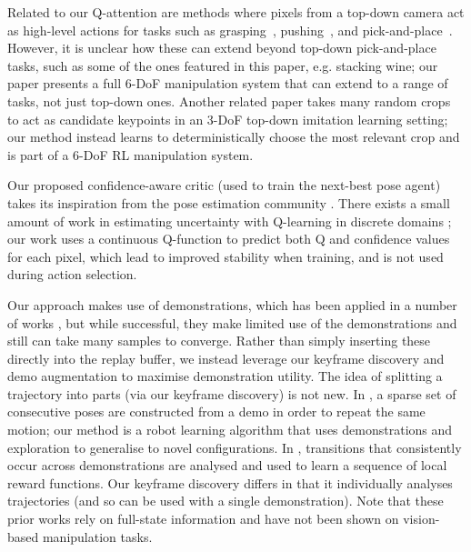 \documentclass[letterpaper, 10 pt, journal, twoside]{IEEEtran}
\begin{document}
Related to our Q-attention are methods where pixels from a top-down camera act as high-level actions for tasks such as grasping~\cite{morrison2018closing}, pushing~\cite{zeng2018learning}, and pick-and-place~\cite{zeng2020transporter}. However, it is unclear how these can extend beyond top-down pick-and-place tasks, such as some of the ones featured in this paper, e.g. stacking wine; our paper presents a full 6-DoF manipulation system that can extend to a range of tasks, not just top-down ones. Another related paper \cite{wang2021generalization} takes many random crops to act as candidate keypoints in an 3-DoF top-down imitation learning setting; our method instead learns to deterministically choose the most relevant crop and is part of a 6-DoF RL manipulation system.

Our proposed confidence-aware critic (used to train the next-best pose agent) takes its inspiration from the pose estimation community \cite{wang2019densefusion, wada2020morefusion}. There exists a small amount of work in estimating uncertainty with Q-learning in discrete domains \cite{clements2019estimating, hoel2020tactical}; our work uses a continuous Q-function to predict both Q and confidence values for each pixel, which lead to improved stability when training, and is not used during action selection.

Our approach makes use of demonstrations, which has been applied in a number of works \cite{vecerik2017leveraging, matas2018sim, kalashnikov2018qt, nair2018overcoming}, but while successful, they make limited use of the demonstrations and still can take many samples to converge. Rather than simply inserting these directly into the replay buffer, we instead leverage our keyframe discovery and demo augmentation to maximise demonstration utility. The idea of splitting a trajectory into parts (via our keyframe discovery) is not new. In \cite{akgun2012keyframe}, a sparse set of consecutive poses are constructed from a demo in order to repeat the same motion; our method is a robot learning algorithm that uses demonstrations and exploration to generalise to novel configurations. In \cite{krishnan2019swirl}, transitions that consistently occur across demonstrations are analysed and used to learn a sequence of local reward functions. Our keyframe discovery differs in that it individually analyses trajectories (and so can be used with a single demonstration). Note that these prior works rely on full-state information and have not been shown on vision-based manipulation tasks.
\end{document}
